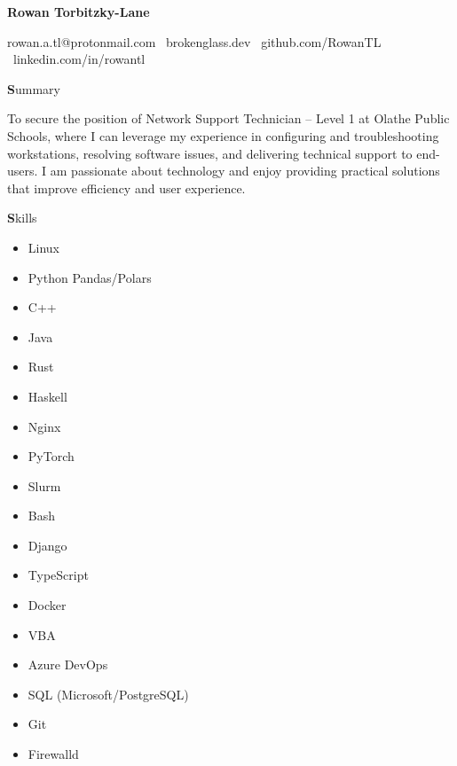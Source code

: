 \documentclass[12pt]{article}
\begin{document}
\begin{center}
    \textbf{\huge Rowan Torbitzky-Lane}\\
    \hrulefill
\end{center}

\begin{center}
    rowan.a.tl@protonmail.com \textbullet \ brokenglass.dev \textbullet \ github.com/RowanTL
    \textbullet \ linkedin.com/in/rowantl
\end{center}


\begin{center}
    \textbf Summary
\end{center}
To secure the position of Network Support Technician – Level 1 at Olathe Public Schools, where I can leverage my experience in configuring and troubleshooting workstations, resolving software issues, and delivering technical support to end-users. I am passionate about technology and enjoy providing practical solutions that improve efficiency and user experience.

\begin{center}
    \textbf Skills
\end{center}

\begin{multicols}{3}
\begin{itemize}[noitemsep]
 \item Linux
 \item Python Pandas/Polars
 \item C++
 \item Java
 \item Rust
 \item Haskell
 \item Nginx
 \item PyTorch
 \item Slurm
 \item Bash
 \item Django
 \item TypeScript
 \item Docker
 \item VBA
 \item Azure DevOps
 \item SQL (Microsoft/PostgreSQL)
 \item Git
 \item Firewalld
\end{itemize}
\end{multicols}
\end{document}
